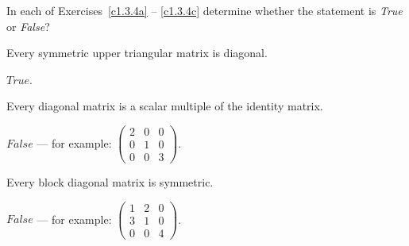 \documentclass{ximera}
\begin{document}
\noindent In each of Exercises~\ref{c1.3.4a} -- \ref{c1.3.4c} determine
whether the statement is {\em True\/} or {\em False\/}?
\begin{exercise} \label{c1.3.4a}
  Every symmetric upper triangular matrix is diagonal.

\begin{solution}
\ans $True$.

\end{solution}
\end{exercise}

\begin{exercise} \label{c1.3.4b}
  Every diagonal matrix is a scalar multiple of the identity matrix.

\begin{solution}
\ans $False$ --- for example:
$\left(\begin{array}{ccc}
2 & 0 & 0 \\
0 & 1 & 0 \\
0 & 0 & 3 \end{array}\right)$.

\end{solution}
\end{exercise}

\begin{exercise} \label{c1.3.4c}
  Every block diagonal matrix is symmetric.

\begin{solution}
\ans $False$ --- for example:
$\left(\begin{array}{ccc}
1 & 2 & 0 \\
3 & 1 & 0 \\
0 & 0 & 4
\end{array}\right)$.

\end{solution}
\end{exercise}
\end{document}
